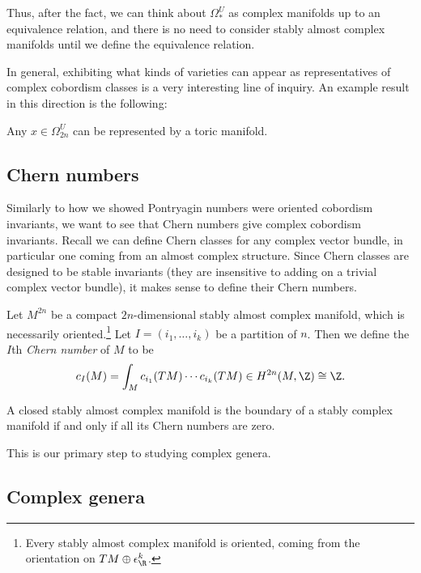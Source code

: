 \documentclass[11pt]{book}
\begin{document}
Thus, after the fact, we can think about $\Omega_\ast^U$ as complex manifolds up to an equivalence relation, and there is no need to consider stably almost complex manifolds until we define the equivalence relation.

In general, exhibiting what kinds of varieties can appear as representatives of complex cobordism classes is a very interesting line of inquiry. An example result in this direction is the following:

\begin{theorem} Any $x\in \Omega^U_{2n}$ can be represented by a toric manifold.
\end{theorem}

\subsection{Chern numbers}

Similarly to how we showed Pontryagin numbers were oriented cobordism invariants, we want to see that Chern numbers give complex cobordism invariants. Recall we can define Chern classes for any complex vector bundle, in particular one coming from an almost complex structure. Since Chern classes are designed to be stable invariants (they are insensitive to adding on a trivial complex vector bundle), it makes sense to define their Chern numbers.

\begin{notation} Let $M^{2n}$ be a compact $2n$-dimensional stably almost complex manifold, which is necessarily oriented.\footnote{Every stably almost complex manifold is oriented, coming from the orientation on $TM \oplus \epsilon_\R^k$.} Let $I = (i_1, \ldots, i_k)$ be a partition of $n$. Then we define the $I$th \emph{Chern number} of $M$ to be
\begin{align*}
    c_I(M) = \int_M c_{i_1}(TM) \cdots c_{i_k}(TM) \in H^{2n}(M,\Z) \cong \Z.
\end{align*}
\end{notation}

\begin{theorem} A closed stably almost complex manifold is the boundary of a stably complex manifold if and only if all its Chern numbers are zero.
\end{theorem}

This is our primary step to studying complex genera.

\subsection{Complex genera}
\end{document}
